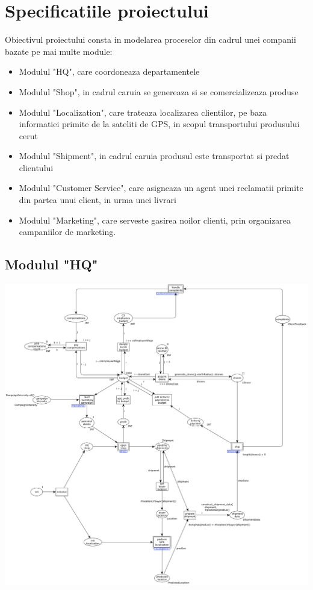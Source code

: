 
\chapter{Specificatiile proiectului}
\begin{spacing}{1.5}
\setlength{\parskip}{0.3in}

Obiectivul proiectului consta in modelarea proceselor din cadrul unei companii bazate pe mai multe module:
\begin{itemize}
\item Modulul "HQ", care coordoneaza departamentele
\item Modulul "Shop", in cadrul caruia se genereaza si se comercializeaza produse
\item Modulul "Localization", care trateaza localizarea clientilor, pe baza informatiei primite de la sateliti de GPS, in scopul transportului produsului cerut
\item Modulul "Shipment", in cadrul caruia produsul este transportat si predat clientului
\item Modulul "Customer Service", care asigneaza un agent unei reclamatii primite din partea unui client, in urma unei livrari
\item Modulul "Marketing", care serveste gasirea noilor clienti, prin organizarea campaniilor de marketing.
\end{itemize}

\section{Modulul "HQ"}

\includegraphics[width=\textwidth]{./Parts/Chapter1/HQ.png}


\end{spacing}
